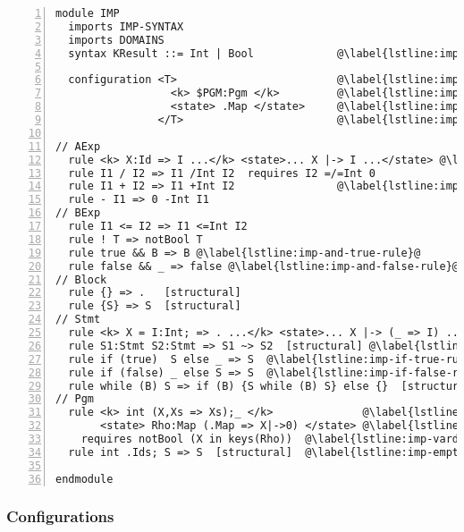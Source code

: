 \begin{lstlisting}[float=t!,
  frame=single,
  style=ksty,
  language=k,
  numbers=left,
  numbersep=5pt,
  basicstyle=\ttfamily\footnotesize,
  caption={$\K$ Semantics of Imp},
  label={lst:imp-semantics},
  xleftmargin=3ex
]
module IMP
  imports IMP-SYNTAX
  imports DOMAINS
  syntax KResult ::= Int | Bool             @\label{lstline:imp-kresult}@

  configuration <T>                         @\label{lstline:imp-config-start}@
                  <k> $PGM:Pgm </k>         @\label{lstline:imp-pgm-var}@
                  <state> .Map </state>     @\label{lstline:imp-pgm-state}@
                </T>                        @\label{lstline:imp-config-end}@

// AExp
  rule <k> X:Id => I ...</k> <state>... X |-> I ...</state> @\label{lstline:imp-lookup-rule}@
  rule I1 / I2 => I1 /Int I2  requires I2 =/=Int 0
  rule I1 + I2 => I1 +Int I2                @\label{lstline:imp-add-rule}@
  rule - I1 => 0 -Int I1
// BExp
  rule I1 <= I2 => I1 <=Int I2
  rule ! T => notBool T
  rule true && B => B @\label{lstline:imp-and-true-rule}@
  rule false && _ => false @\label{lstline:imp-and-false-rule}@
// Block
  rule {} => .   [structural]
  rule {S} => S  [structural]
// Stmt
  rule <k> X = I:Int; => . ...</k> <state>... X |-> (_ => I) ...</state> @\label{lstline:imp-assgn-rule}@
  rule S1:Stmt S2:Stmt => S1 ~> S2  [structural] @\label{lstline:imp-stmt-decomp-rule}@
  rule if (true)  S else _ => S  @\label{lstline:imp-if-true-rule}@
  rule if (false) _ else S => S  @\label{lstline:imp-if-false-rule}@
  rule while (B) S => if (B) {S while (B) S} else {}  [structural]
// Pgm
  rule <k> int (X,Xs => Xs);_ </k>              @\label{lstline:imp-vardec-rule-begin}@
       <state> Rho:Map (.Map => X|->0) </state> @\label{lstline:imp-vardec-rule-end}@
    requires notBool (X in keys(Rho))  @\label{lstline:imp-vardec-requires}@
  rule int .Ids; S => S  [structural]  @\label{lstline:imp-emptydec-rule}@

endmodule
\end{lstlisting}

\subsubsection{Configurations}\label{sec:k-configuration}

